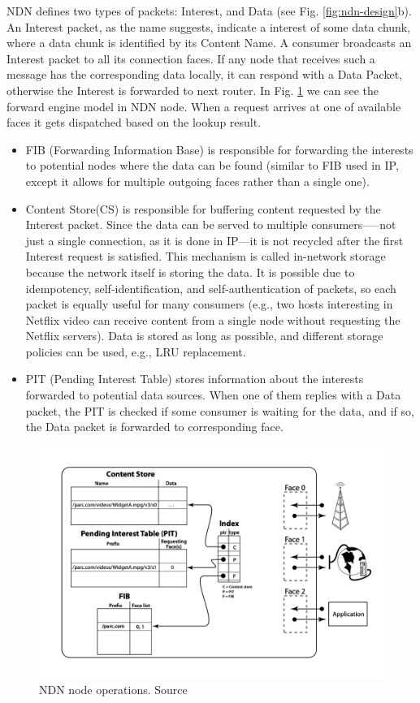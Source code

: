 NDN defines two types of packets: Interest, and Data (see Fig. \ref{fig:ndn-design}b). An Interest packet, as the name suggests, indicate a interest of some data chunk, where a data chunk is identified by its Content Name. A consumer broadcasts an Interest packet to all its connection faces. If any node that receives such a message has the corresponding data locally, it can respond with a Data Packet, otherwise the Interest is forwarded to next router. In Fig. \ref{fig:ndn-operations} we can see the forward engine model in NDN node. When a request arrives at one of available faces it gets dispatched based on the lookup result. 

\begin{itemize}
    \item FIB (Forwarding Information Base) is responsible for forwarding the interests to potential nodes where the data can be found (similar to FIB used in IP, except it allows for multiple outgoing faces rather than a single one). 

    \item Content Store(CS) is responsible for buffering content requested by the Interest packet. Since the data can be served to multiple consumers–––not just a single connection, as it is done in IP––it is not recycled after the first Interest request is satisfied. This mechanism is called in-network storage because the network itself is storing the data. It is possible due to idempotency, self-identification, and self-authentication of packets, so each packet is equally useful for many consumers (e.g., two hosts interesting in Netflix video can receive content from a single node without requesting the Netflix servers). Data is stored as long as possible, and different storage policies can be used, e.g., LRU replacement.

    \item PIT (Pending Interest Table) stores information about the interests forwarded to potential data sources. When one of them replies with a Data packet, the PIT is checked if some consumer is waiting for the data, and if so, the Data packet is forwarded to corresponding face.
\end{itemize}
\begin{figure}[h]
    \centering
    \includegraphics[width=\linewidth]{img/ndn-operations.png}
    \caption{NDN node operations. Source \cite{jacobson2009networking}}
    \label{fig:ndn-operations}
\end{figure}
